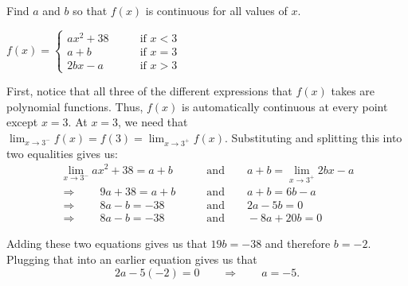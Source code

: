 \documentclass[nooutcomes]{ximera}
\begin{document}
\begin{problem}
Find $a$ and $b$ so that $f(x)$ is continuous for all values of $x$.
	
	$f(x) =   \left\{ \begin{array}{ll}
	ax^2 + 38		 	&	\qquad \text{if } x < 3	\\
	a + b 				&	\qquad \text{if } x = 3	\\
	2bx - a			&	\qquad \text{if } x > 3	\end{array} \right.  $

	\begin{freeResponse}
	
	First, notice that all three of the different expressions that $f(x)$ takes are polynomial functions.  Thus, $f(x)$ is automatically continuous at every point except $x = 3$.  At $x = 3$, we need that $\lim_{x \to 3^-} f(x) = f(3) = \lim_{x \to 3^+} f(x)$.  Substituting and splitting this into two equalities gives us:
	\begin{align*}
	\lim_{x \to 3^-} ax^2 + 38 = a + b \qquad &\text{and} \qquad a + b = \lim_{x \to 3^+} 2bx-a  \\
	\Longrightarrow \qquad 9a + 38 = a + b \qquad &\text{and} \qquad a + b = 6b - a  \\
	\Longrightarrow \qquad 8a - b = -38 \qquad &\text{and} \qquad 2a - 5b = 0  \\
	\Longrightarrow \qquad 8a - b = -38 \qquad &\text{and} \qquad -8a + 20b = 0
	\end{align*}
	
	Adding these two equations gives us that $19b = -38$ and therefore $b = -2$.  Plugging that into an earlier equation gives us that 			$$2a - 5(-2) = 0 \qquad \Longrightarrow \qquad a = -5.$$
	
	\end{freeResponse}
\end{problem}
	
	
	
	
	
	
	
	
	
\end{document}
